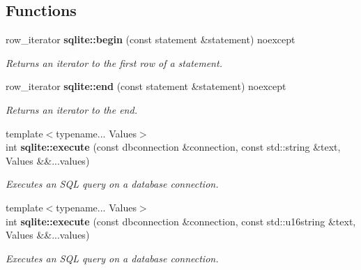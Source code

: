 \subsection*{Functions}
\begin{DoxyCompactItemize}
\item 
row\-\_\-iterator {\bfseries sqlite\-::begin} (const statement \&statement) noexcept
\begin{DoxyCompactList}\small\item\em Returns an iterator to the first row of a statement. \end{DoxyCompactList}\item 
row\-\_\-iterator {\bfseries sqlite\-::end} (const statement \&statement) noexcept
\begin{DoxyCompactList}\small\item\em Returns an iterator to the end. \end{DoxyCompactList}\item 
{\footnotesize template$<$typename... Values$>$ }\\int {\bfseries sqlite\-::execute} (const dbconnection \&connection, const std\-::string \&text, Values \&\&...values)
\begin{DoxyCompactList}\small\item\em Executes an S\-Q\-L query on a database connection. \end{DoxyCompactList}\item 
{\footnotesize template$<$typename... Values$>$ }\\int {\bfseries sqlite\-::execute} (const dbconnection \&connection, const std\-::u16string \&text, Values \&\&...values)
\begin{DoxyCompactList}\small\item\em Executes an S\-Q\-L query on a database connection. \end{DoxyCompactList}\end{DoxyCompactItemize}
